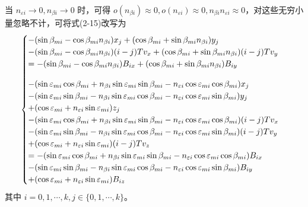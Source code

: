 当 $n_{\varepsilon i}\rightarrow 0 , n_{\beta i} \rightarrow 0$ 时，可得 $o(n_{\beta i}) \approx 0, o(n_{\varepsilon i}) \approx 0, n_{\beta i}n_{\varepsilon i} \approx 0$，对这些无穷小量忽略不计，可将式(2-15)改写为
\begin{equation}
	\begin{cases}
		-(\sin\beta_{mi} - \cos\beta_{mi}n_{\beta i})x_j +(\cos\beta_{mi} + \sin\beta_{mi}n_{\beta i})y_j \\
		-(\sin\beta_{mi} - \cos\beta_{mi}n_{\beta i})(i-j)T v_x +(\cos\beta_{mi} + \sin\beta_{mi}n_{\beta i})(i-j)T v_y \\ \vspace{10pt}
		=-(\sin\beta_{mi} - \cos\beta_{mi}n_{\beta i})B_{ix} +(\cos\beta_{mi} + \sin\beta_{mi}n_{\beta i})B_{iy} \\ 
		-(\sin\varepsilon_{mi}\cos\beta_{mi} + n_{\beta i}\sin\varepsilon_{mi}\sin\beta_{mi} -n_{\varepsilon i}\cos\varepsilon_{mi}\cos\beta_{mi})x_j \\
		-(\sin\varepsilon_{mi}\sin\beta_{mi} -n_{\beta i}\sin\varepsilon_{mi}\cos\beta_{mi} - n_{\varepsilon i}\cos\varepsilon_{mi}\sin\beta_{mi})y_j \\ 
		+(\cos\varepsilon_{mi} + n_{\varepsilon i}\sin\varepsilon_{mi})z_j \\
		-(\sin\varepsilon_{mi}\cos\beta_{mi} + n_{\beta i}\sin\varepsilon_{mi}\sin\beta_{mi} -n_{\varepsilon i}\cos\varepsilon_{mi}\cos\beta_{mi})(i-j)T v_x \\
		-(\sin\varepsilon_{mi}\sin\beta_{mi} -n_{\beta i}\sin\varepsilon_{mi}\cos\beta_{mi} -n_{\varepsilon i} \cos\varepsilon_{mi}\sin\beta_{mi})(i-j)T v_y \\
		+(\cos\varepsilon_{mi} + n_{\varepsilon i}\sin\varepsilon_{mi})(i-j)T v_z \\
		=-(\sin\varepsilon_{mi}\cos\beta_{mi} +n_{\beta i} \sin\varepsilon_{mi}\sin\beta_{mi} -n_{\varepsilon i}\cos\varepsilon_{mi}\cos\beta_{mi})B_{ix} \\
		-(\sin\varepsilon_{mi}\sin\beta_{mi} -n_{\beta i}\sin\varepsilon_{mi}\cos\beta_{mi} -n_{\varepsilon i} \cos\varepsilon_{mi}\sin\beta_{mi})B_{iy} \\
		+(\cos\varepsilon_{mi} + n_{\varepsilon i}\sin\varepsilon_{mi})B_{iz} \\
	\end{cases}
\end{equation}
其中 $i=0,1,\cdots,k,j \in \lbrace 0,1,\cdots, k \rbrace$。

